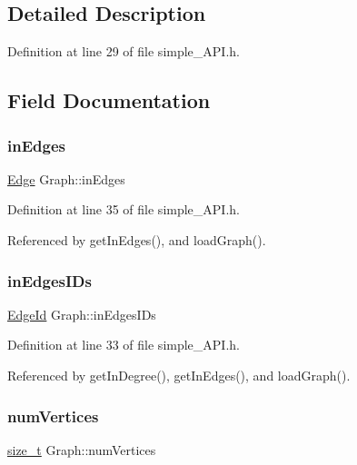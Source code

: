 \subsection{Detailed Description}


Definition at line 29 of file simple\+\_\+\+A\+P\+I.\+h.



\subsection{Field Documentation}
\mbox{\label{structGraph_a0b666804024b15dc19465a6dcbf3e4b7}} 
\subsubsection{\texorpdfstring{in\+Edges}{inEdges}}
{\footnotesize\ttfamily \hyperlink{structEdge}{Edge} Graph\+::in\+Edges}



Definition at line 35 of file simple\+\_\+\+A\+P\+I.\+h.



Referenced by get\+In\+Edges(), and load\+Graph().

\mbox{\label{structGraph_affecc30a95a9a136b0ca8270a6b2ff6f}} 
\subsubsection{\texorpdfstring{in\+Edges\+I\+Ds}{inEdgesIDs}}
{\footnotesize\ttfamily \hyperlink{first_2common_2simple__API_8h_a607d67511109aa62187da7c6e6a0167c}{Edge\+Id} Graph\+::in\+Edges\+I\+Ds}



Definition at line 33 of file simple\+\_\+\+A\+P\+I.\+h.



Referenced by get\+In\+Degree(), get\+In\+Edges(), and load\+Graph().

\mbox{\label{structGraph_a239f350e2feccae28fe83e7bc08dd790}} 
\subsubsection{\texorpdfstring{num\+Vertices}{numVertices}}
{\footnotesize\ttfamily \hyperlink{tutorial__fpt__2017_2intro_2sixth_2test_8c_a7c94ea6f8948649f8d181ae55911eeaf}{size\+\_\+t} Graph\+::num\+Vertices}



